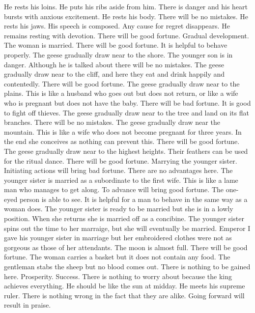 	{He rests his loins. He puts his ribs aside from him. There is danger and his heart bursts with
		anxious excitement.}
	{He rests his body. There will be no mistakes.}
	{He rests his jaws. His speech is composed. Any cause for regret disappears.}
	{He remains resting with devotion. There will be good fortune.}
\or {}
	{Gradual development. The woman is married. There will be good fortune. It is helpful to behave properly.}
	{The geese gradually draw near to the shore. The younger son is in danger. Although he is talked about
		there will be no mistakes.}
	{The geese gradually draw near to the cliff, and here they eat and drink happily and contentedly. There
		will be good fortune.}
	{The geese gradually draw near to the plains. This is like a husband who goes out but does not return,
		or like a wife who is pregnant but does not have the baby. There will be bad fortune. It is good
		to fight off thieves.}
	{The geese gradually draw near to the tree and land on its flat branches. There will be no mistakes.}
	{The geese gradually draw near the mountain. This is like a wife who does not become pregnant for three
		years. In the end she conceives as nothing can prevent this. There will be good fortune.}
	{The geese gradually draw near to the highest heights. Their feathers can be used for the ritual dance.
		There will be good fortune.}
\or {}
	{Marrying the younger sister. Initiating actions will bring bad fortune. There are no advantages here.}
	{The younger sister is married as a subordinate to the first wife. This is like a lame man who manages
		to get along. To advance will bring good fortune.}
	{The one-eyed person is able to see. It is helpful for a man to behave in the same way as a woman does.}
	{The younger sister is ready to be married but she is in a lowly position. When she returns she is
		married off as a concibine.}
	{The younger sister spins out the time to her marraige, but she will eventually be married.}
	{Emperor I gave his younger sister in marriage but her embroidered clothes were not as gorgeous as
		those of her attendants. The moon is almost full. There will be good fortune.}
	{The woman carries a basket but it does not contain any food. The gentleman stabs the sheep but no
		blood comes out. There is nothing to be gained here.}
\or {}
	{Prosperity. Success. There is nothing to worry about because the king achieves everything. He should
		be like the sun at midday.}
	{He meets his supreme ruler. There is nothing wrong in the fact that they are alike. Going forward
		will result in praise.}
